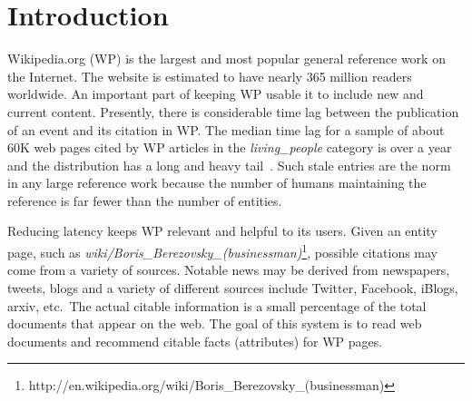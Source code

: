 
\section{Introduction}

Wikipedia.org (WP) is the largest and most popular general reference work on the Internet.
The website is estimated to have nearly 365 million readers worldwide.
An important part of keeping WP usable it to include new and current content.
Presently, there is considerable time lag between the publication of an event and its citation in WP\@.
The median time lag for a sample of about 60K web pages cited by WP articles in the \textit{living\_people} category is over a year and the distribution has a long and heavy tail~\cite{JFrank12}.
Such stale entries are the norm in any large reference work because the number
of humans maintaining the reference is far fewer than the number of entities.

Reducing latency keeps WP relevant and helpful to its users.
Given an entity page, such as \textsl{wiki/Boris\_Berezovsky\_(businessman)}\footnote{http://en.wikipedia.org/wiki/Boris\_Berezovsky\_(businessman)},
possible citations may come from a variety of sources.
Notable news may be derived from newspapers, tweets, blogs and a variety of
different sources include Twitter, Facebook, iBlogs, arxiv, etc.\
The actual citable information is a small percentage of the total documents that appear on the web.
The goal of this system is to read web documents and recommend citable facts (attributes) for WP pages.


